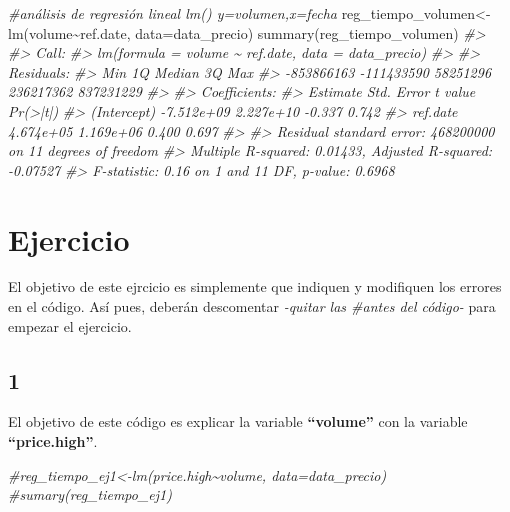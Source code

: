 \documentclass[
]{book}
\newenvironment{Shaded}{\begin{snugshade}}{\end{snugshade}}
\newcommand{\AttributeTok}[1]{\textcolor[rgb]{0.77,0.63,0.00}{#1}}
\newcommand{\CommentTok}[1]{\textcolor[rgb]{0.56,0.35,0.01}{\textit{#1}}}
\newcommand{\FunctionTok}[1]{\textcolor[rgb]{0.00,0.00,0.00}{#1}}
\newcommand{\NormalTok}[1]{#1}
\newcommand{\OtherTok}[1]{\textcolor[rgb]{0.56,0.35,0.01}{#1}}
\newcommand{\SpecialCharTok}[1]{\textcolor[rgb]{0.00,0.00,0.00}{#1}}
\begin{document}
\begin{Shaded}
\begin{Highlighting}[]
\CommentTok{\#análisis de regresión lineal lm() y=volumen,x=fecha}
\NormalTok{reg\_tiempo\_volumen}\OtherTok{\textless{}{-}}\FunctionTok{lm}\NormalTok{(volume}\SpecialCharTok{\textasciitilde{}}\NormalTok{ref.date, }\AttributeTok{data=}\NormalTok{data\_precio)}
\FunctionTok{summary}\NormalTok{(reg\_tiempo\_volumen)}
\CommentTok{\#\textgreater{} }
\CommentTok{\#\textgreater{} Call:}
\CommentTok{\#\textgreater{} lm(formula = volume \textasciitilde{} ref.date, data = data\_precio)}
\CommentTok{\#\textgreater{} }
\CommentTok{\#\textgreater{} Residuals:}
\CommentTok{\#\textgreater{}        Min         1Q     Median         3Q        Max }
\CommentTok{\#\textgreater{} {-}853866163 {-}111433590   58251296  236217362  837231229 }
\CommentTok{\#\textgreater{} }
\CommentTok{\#\textgreater{} Coefficients:}
\CommentTok{\#\textgreater{}               Estimate Std. Error t value Pr(\textgreater{}|t|)}
\CommentTok{\#\textgreater{} (Intercept) {-}7.512e+09  2.227e+10  {-}0.337    0.742}
\CommentTok{\#\textgreater{} ref.date     4.674e+05  1.169e+06   0.400    0.697}
\CommentTok{\#\textgreater{} }
\CommentTok{\#\textgreater{} Residual standard error: 468200000 on 11 degrees of freedom}
\CommentTok{\#\textgreater{} Multiple R{-}squared:  0.01433,    Adjusted R{-}squared:  {-}0.07527 }
\CommentTok{\#\textgreater{} F{-}statistic:  0.16 on 1 and 11 DF,  p{-}value: 0.6968}
\end{Highlighting}
\end{Shaded}

\hypertarget{ejercicio}{%
\section{Ejercicio}\label{ejercicio}}

El objetivo de este ejrcicio es simplemente que indiquen y modifiquen los errores en el código. Así pues, deberán descomentar \emph{-quitar las \#antes del código-} para empezar el ejercicio.

\hypertarget{section}{%
\subsection{1}\label{section}}

El objetivo de este código es explicar la variable \textbf{``volume''} con la variable \textbf{``price.high''}.

\begin{Shaded}
\begin{Highlighting}[]
\CommentTok{\#reg\_tiempo\_ej1\textless{}{-}lm(price.high\textasciitilde{}volume, data=data\_precio)}
\CommentTok{\#sumary(reg\_tiempo\_ej1)}
\end{Highlighting}
\end{Shaded}
\end{document}
